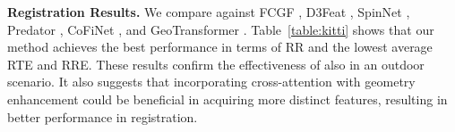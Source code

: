 \noindent\textbf{Registration Results.} 
We compare \ourmethod against FCGF \cite{choy2019fully}, D3Feat \cite{bai2020d3feat}, SpinNet \cite{ao2021spinnet}, Predator \cite{huang2021predator}, CoFiNet \cite{yu2021cofinet}, and GeoTransformer \cite{qin2022geometric}. 
Table~\ref{table:kitti} shows that our method achieves the best performance in terms of RR and the lowest average RTE and RRE.
These results confirm the effectiveness of \ourmethod also in an outdoor scenario.
It also suggests that incorporating cross-attention with geometry enhancement could be beneficial in acquiring more distinct features, resulting in better performance in registration.




